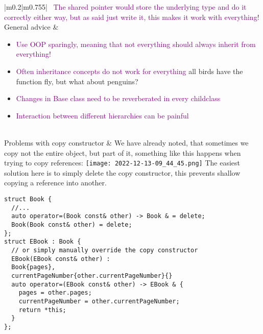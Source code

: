 \documentclass[main.tex,fontsize=8pt,paper=a4,paper=portrait,DIV=calc]{scrartcl}
\begin{document}
\begin{table}[ht!]
\begin{tabular}{|m{0.2\linewidth}|m{0.755\linewidth}|}
\, \newline
\textcolor{purple}{The shared pointer would store the underlying type and do it correctly either way, but as said just write it, this makes it work with everything!}\\
\hline
General advice & 
\vspace{2mm}
\begin{itemize}
\item \textcolor{purple}{Use OOP sparingly, meaning that not everything should always inherit from everything!}
\item \textcolor{purple}{Often inheritance concepts do not work for everything}\newline
  all birds have the function fly, but what about penguins?
\item \textcolor{purple}{Changes in Base class need to be reverberated in every childclass}
\item \textcolor{purple}{Interaction between different hierarchies can be painful}
\vspace{-3mm}
\end{itemize} 
\\
\hline
Problems with copy constructor & 
We have already noted, that sometimes we copy not the entire object, but part of it, something like this happens when trying to copy references:\newline
\texttt{[image: 2022-12-13-09\_44\_45.png]}\newline
The easiest solution here is to simply delete the copy constructor, this prevents shallow copying a reference into another.\newline
\begin{lstlisting}
struct Book {
  //...
  auto operator=(Book const& other) -> Book & = delete;
  Book(Book const& other) = delete;
};
struct EBook : Book {
  // or simply manually override the copy constructor
  EBook(EBook const& other) :
  Book{pages},
  currentPageNumber{other.currentPageNumber}{}
  auto operator=(EBook const& other) -> EBook & {
    pages = other.pages;
    currentPageNumber = other.currentPageNumber;
    return *this;
  }
};
\end{lstlisting}
\\
\hline
\end{tabular}
\end{table}
\pagebreak
\end{document}
